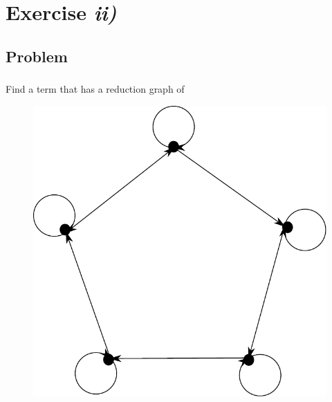 \documentclass{beamer}
\theoremstyle{definition}
\theoremstyle{remark}
\theoremstyle{example}
\newif\ifinsection
\newif\ifinsubsection
\let\oldsection\section
\renewcommand{\section}{
  \global\insectiontrue
  \global\insubsectionfalse
  \oldsection}
\let\oldsubsection\subsection
\renewcommand{\subsection}{
  \global\insubsectiontrue
  \oldsubsection}
\newcommand {\aframe}[1] {
  \begin{frame}
    \ifinsection\frametitle{\secname}\fi
    \ifinsubsection\framesubtitle{\subsecname}\fi
  #1
  \end{frame}
}
\begin{document}
\section{Exercise \textit{ii)}}
\subsection{Problem}
\aframe{Find a term that has a reduction graph of
  \begin{figure}[H]
    \centering \includegraphics[scale=0.5]{../../graphs/exercise-3-5-2-ii.pdf}
  \end{figure}
}
\end{document}
